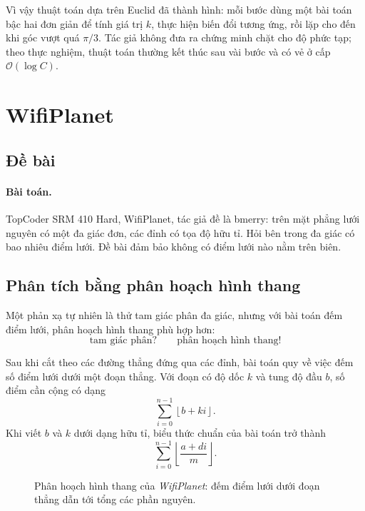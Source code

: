 \documentclass[11pt]{article}
\newcommand{\Oh}{\mathcal{O}}
\newcommand{\floor}[1]{\left\lfloor #1\right\rfloor}
\begin{document}
Vì vậy thuật toán dựa trên Euclid đã thành hình: mỗi bước dùng một bài toán
bậc hai đơn giản để tính giá trị $k$, thực hiện biến đổi tương ứng, rồi lặp
cho đến khi góc vượt quá $\pi/3$. Tác giả không đưa ra chứng minh chặt cho độ
phức tạp; theo thực nghiệm, thuật toán thường kết thúc sau vài bước và có vẻ
ở cấp $\Oh(\log C)$.

\section{WifiPlanet}

\subsection{Đề bài}

\paragraph{Bài toán.}
TopCoder SRM 410 Hard, WifiPlanet, tác giả đề là bmerry: trên mặt phẳng lưới
nguyên có một đa giác đơn, các đỉnh có tọa độ hữu tỉ. Hỏi bên trong đa giác có
bao nhiêu điểm lưới. Đề bài đảm bảo không có điểm lưới nào nằm trên biên.

\subsection{Phân tích bằng phân hoạch hình thang}

Một phản xạ tự nhiên là thử tam giác phân đa giác, nhưng với bài toán đếm
điểm lưới, phân hoạch hình thang phù hợp hơn:
\[
  \text{tam giác phân?}\qquad \text{phân hoạch hình thang!}
\]

Sau khi cắt theo các đường thẳng đứng qua các đỉnh, bài toán quy về việc đếm
số điểm lưới dưới một đoạn thẳng. Với đoạn có độ dốc $k$ và tung độ đầu $b$,
số điểm cần cộng có dạng
\[
  \sum_{i=0}^{n-1}\floor{b+ki}.
\]
Khi viết $b$ và $k$ dưới dạng hữu tỉ, biểu thức chuẩn của bài toán trở thành
\[
  \sum_{i=0}^{n-1}\floor{\frac{a+di}{m}}. \tag{2}
\]

\begin{figure}[ht]
\centering
{}
\caption{Phân hoạch hình thang của \textit{WifiPlanet}: đếm điểm lưới dưới đoạn thẳng dẫn tới tổng các phần nguyên.}
\end{figure}
\end{document}
